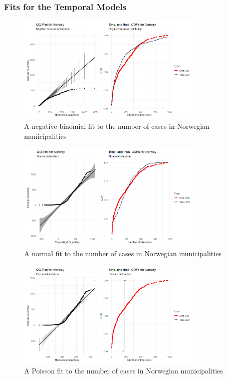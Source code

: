 \subsubsection{Fits for the Temporal Models}
\begin{figure}[H]
  \centering
  \includegraphics[width = 0.8\textwidth]{fit_nbinom_norway_ts.png}
  \caption{A negative binomial fit to the number of cases in Norwegian municipalities}
  \label{fitNegbinomNorway_ts}
\end{figure}
\begin{figure}[H]
  \centering
  \includegraphics[width = 0.8\textwidth]{fit_normal_norway_ts.png}
  \caption{A normal fit to the number of cases in Norwegian municipalities}
  \label{fitNormalNorway_ts}
\end{figure}
\begin{figure}[H]
  \centering
  \includegraphics[width = 0.8\textwidth]{fit_poisson_norway_ts.png}
  \caption{A Poisson fit to the number of cases in Norwegian municipalities}
  \label{fitPoissonNorway_ts}
\end{figure}
